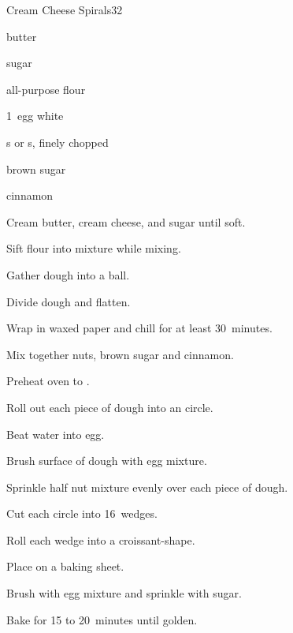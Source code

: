 \begin{recipe}{Cream Cheese Spirals}{}{32}

\begin{ingredients}
\item {} butter
\item {} 
\item \C{\quarter} sugar
\item {} all-purpose flour
\item 1~egg white
\item {} s or s, finely chopped
\item \C{\half} brown sugar
\item {} cinnamon
\end{ingredients}

\begin{directions}
\item Cream butter, cream cheese, and sugar until soft.
\item Sift flour into mixture while mixing.
\item Gather dough into a ball.
\item Divide dough and flatten.
\item Wrap in waxed paper and chill for at least 30~minutes.
\item Mix together nuts, brown sugar and cinnamon.
\item Preheat oven to .
\item Roll out each piece of dough into an  circle.
\item Beat  water into egg.
\item Brush surface of dough with egg mixture.
\item Sprinkle half nut mixture evenly over each piece of dough.
\item Cut each circle into 16~wedges.
\item Roll each wedge into a croissant-shape.
\item Place on a baking sheet.
\item Brush with egg mixture and sprinkle with sugar.
\item Bake for 15 to 20~minutes until golden.
\end{directions}
\end{recipe}
